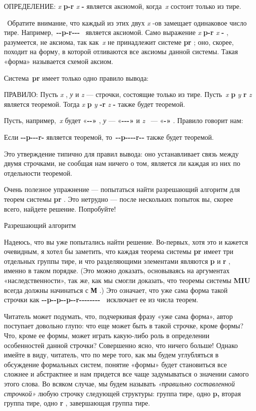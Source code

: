 ОПРЕДЕЛЕНИЕ: \emph{x} \textbf{p-r} \emph{x} \textbf{-} является аксиомой, когда~\emph{x} состоит только из тире.

~Обратите внимание, что каждый из этих двух \emph{x} -ов замещает одинаковое число тире. Например,~\textbf{-\/-p-r-\/-\/-} ~является аксиомой. Само выражение \emph{x} \textbf{p-r} \emph{x} \textbf{-} , разумеется, не аксиома, так как~\emph{x} не принадлежит системе \textbf{pr} ; оно, скорее, походит на форму, в которой отливаются все аксиомы данной системы. Такая «форма» называется схемой аксиом.

Система~\textbf{pr} имеет только одно правило вывода:

ПРАВИЛО: Пусть \emph{x} , \emph{у} и \emph{z} --- строчки, состоящие только из тире. Пусть~\emph{x} \textbf{p} \emph{y} \textbf{r} \emph{z} является теоремой. Тогда \emph{x} \textbf{p} \emph{y} \textbf{-r} \emph{z} \textbf{-} также будет теоремой.

Пусть, например,~\emph{x} будет «\textbf{-\/-»} , \emph{у} --- «\textbf{-\/-\/-»} и \emph{z} ~--- «\textbf{-»} . Правило говорит нам:

Если \textbf{-\/-p-\/-\/-r-} является теоремой, то~\textbf{-\/-p-\/-\/-\/-r-\/-} также будет теоремой.

Это утверждение типично для правил вывода: оно устанавливает связь между двумя строчками, не сообщая нам ничего о том, является ли каждая из них по отдельности теоремой.

Очень полезное упражнение --- попытаться найти разрешающий алгоритм для теорем системы \textbf{pr} . Это нетрудно --- после нескольких попыток вы, скорее всего, найдете решение. Попробуйте!

Разрешающий алгоритм

Надеюсь, что вы уже попытались найти решение. Во-первых, хотя это и кажется очевидным, я хотел бы заметить, что каждая теорема системы \textbf{pr} имеет три отдельных группы тире, и что разделяющими элементами являются \textbf{p} и \textbf{r} , именно в таком порядке. (Это можно доказать, основываясь на аргументах «наследственности», так же, как мы смогли доказать, что теоремы системы \textbf{MIU} всегда должны начинаться с \textbf{М} .) Это означает, что уже сама форма такой строчки как \textbf{-\/-p-\/-p-\/-p-\/-r-\/-\/-\/-\/-\/-\/-\/-~} исключает ее из числа теорем.

Читатель может подумать, что, подчеркивая фразу «уже сама форма», автор поступает довольно глупо: что еще может быть в такой строчке, кроме формы? Что, кроме ее формы, может играть какую-либо роль в определении особенностей данной строчки? Совершенно ясно, что ничего больше! Однако имейте в виду, читатель, что по мере того, как мы будем углубляться в обсуждение формальных систем, понятие «формы» будет становиться все сложнее и абстрактнее и нам придется все чаще задумываться о значении самого этого слова. Во всяком случае, мы будем называть \emph{«правильно составленной строчкой»} любую строчку следующей структуры: группа тире, одно \textbf{p,} вторая группа тире, одно \textbf{r} , завершающая группа тире.

